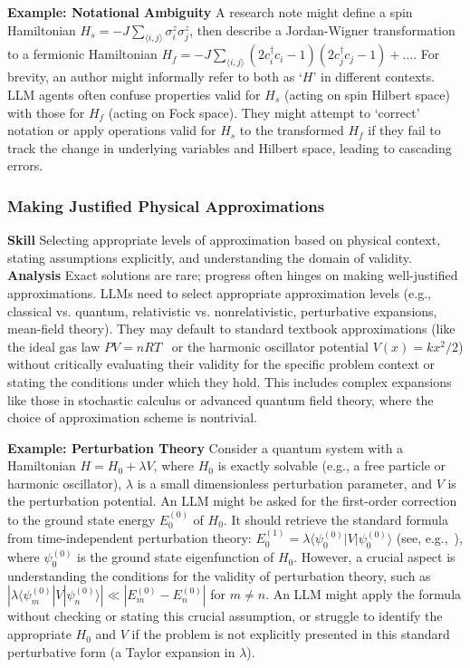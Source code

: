 \textbf{Example: Notational Ambiguity} A research note might define a spin Hamiltonian $H_s = -J \sum_{\langle i,j \rangle} \sigma_i^z \sigma_j^z$, then describe a Jordan-Wigner transformation to a fermionic Hamiltonian $H_f = -J \sum_{\langle i,j \rangle} (2c_i^\dagger c_i - 1)(2c_j^\dagger c_j - 1) + \dots$. For brevity, an author might informally refer to both as `$H$' in different contexts. LLM agents often confuse properties valid for $H_s$ (acting on spin Hilbert space) with those for $H_f$ (acting on Fock space). They might attempt to `correct' notation or apply operations valid for $H_s$ to the transformed $H_f$ if they fail to track the change in underlying variables and Hilbert space, leading to cascading errors.
\subsubsection{Making Justified Physical Approximations}
\label{sec:skill_approximations}
\textbf{Skill} Selecting appropriate levels of approximation based on physical context, stating assumptions explicitly, and understanding the domain of validity.
\textbf{Analysis} Exact solutions are rare; progress often hinges on making well-justified approximations. LLMs need to select appropriate approximation levels (e.g., classical vs. quantum, relativistic vs. nonrelativistic, perturbative expansions, mean-field theory). They may default to standard textbook approximations (like the ideal gas law $PV=nRT$~\cite{Reif1965Fundamentals} or the harmonic oscillator potential $V(x) = kx^2/2$) without critically evaluating their validity for the specific problem context or stating the conditions under which they hold. This includes complex expansions like those in stochastic calculus or advanced quantum field theory, where the choice of approximation scheme is nontrivial.

\textbf{Example: Perturbation Theory} Consider a quantum system with a Hamiltonian $H = H_0 + \lambda V$, where $H_0$ is exactly solvable (e.g., a free particle or harmonic oscillator), $\lambda$ is a small dimensionless perturbation parameter, and $V$ is the perturbation potential. An LLM might be asked for the first-order correction to the ground state energy $E_0^{(0)}$ of $H_0$. It should retrieve the standard formula from time-independent perturbation theory: $E_0^{(1)} = \lambda \langle \psi_0^{(0)} | V | \psi_0^{(0)} \rangle$ (see, e.g.,~\cite{Sakurai2017Modern}), where $\psi_0^{(0)}$ is the ground state eigenfunction of $H_0$. However, a crucial aspect is understanding the conditions for the validity of perturbation theory, such as $|\lambda \langle \psi_m^{(0)} | V | \psi_n^{(0)} \rangle| \ll |E_m^{(0)} - E_n^{(0)}|$ for $m \neq n$. An LLM might apply the formula without checking or stating this crucial assumption, or struggle to identify the appropriate $H_0$ and $V$ if the problem is not explicitly presented in this standard perturbative form (a Taylor expansion in $\lambda$).

